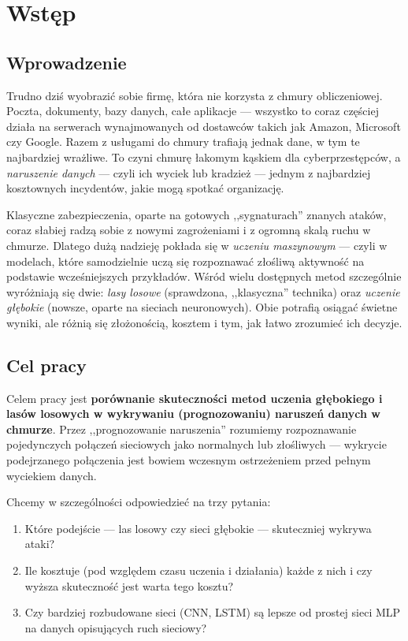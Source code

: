 \section{Wstęp}
\label{sec:wstep}

\subsection{Wprowadzenie}

Trudno dziś wyobrazić sobie firmę, która nie korzysta z chmury obliczeniowej.
Poczta, dokumenty, bazy danych, całe aplikacje --- wszystko to coraz częściej
działa na serwerach wynajmowanych od dostawców takich jak Amazon, Microsoft czy
Google. Razem z usługami do chmury trafiają jednak dane, w tym te najbardziej
wrażliwe. To czyni chmurę łakomym kąskiem dla cyberprzestępców, a \emph{naruszenie
danych} --- czyli ich wyciek lub kradzież --- jednym z najbardziej kosztownych
incydentów, jakie mogą spotkać organizację.

Klasyczne zabezpieczenia, oparte na gotowych ,,sygnaturach'' znanych ataków,
coraz słabiej radzą sobie z nowymi zagrożeniami i z ogromną skalą ruchu w
chmurze. Dlatego dużą nadzieję pokłada się w \emph{uczeniu maszynowym} --- czyli
w modelach, które samodzielnie uczą się rozpoznawać złośliwą aktywność na
podstawie wcześniejszych przykładów. Wśród wielu dostępnych metod szczególnie
wyróżniają się dwie: \emph{lasy losowe} (sprawdzona, ,,klasyczna'' technika) oraz
\emph{uczenie głębokie} (nowsze, oparte na sieciach neuronowych). Obie potrafią
osiągać świetne wyniki, ale różnią się złożonością, kosztem i tym, jak łatwo
zrozumieć ich decyzje.

\subsection{Cel pracy}

Celem pracy jest \textbf{porównanie skuteczności metod uczenia głębokiego i
lasów losowych w wykrywaniu (prognozowaniu) naruszeń danych w chmurze}. Przez
,,prognozowanie naruszenia'' rozumiemy rozpoznawanie pojedynczych połączeń
sieciowych jako normalnych lub złośliwych --- wykrycie podejrzanego połączenia
jest bowiem wczesnym ostrzeżeniem przed pełnym wyciekiem danych.

Chcemy w szczególności odpowiedzieć na trzy pytania:
\begin{enumerate}
  \item Które podejście --- las losowy czy sieci głębokie --- skuteczniej
        wykrywa ataki?
  \item Ile kosztuje (pod względem czasu uczenia i działania) każde z nich i czy
        wyższa skuteczność jest warta tego kosztu?
  \item Czy bardziej rozbudowane sieci (CNN, LSTM) są lepsze od prostej sieci
        MLP na danych opisujących ruch sieciowy?
\end{enumerate}

